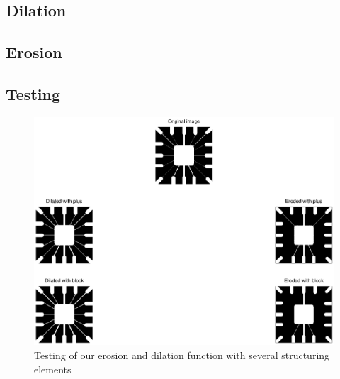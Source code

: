 \subsection{Dilation}
\subsection{Erosion}
\subsection{Testing}
\begin{figure}[htb]
 \centering
 \includegraphics[width=\linewidth]{erosiondilation.eps}
 \caption{Testing of our erosion and dilation function with several structuring elements}
 \label{fig:erosiondilation}
\end{figure}

\clearpage